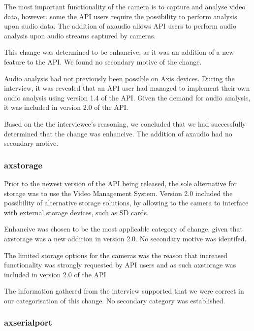 \documentclass{sig-alternate}
\begin{document}
The most important functionality of the camera is to capture and analyse video data, however, some the API users require the possibility to perform analysis upon audio data. The addition of axaudio allows API users to perform audio analysis upon audio streams captured by cameras. 

This change was determined to be enhancive, as it was an addition of a new feature to the API. We found no secondary motive of the change. 


Audio analysis had not previously been possible on Axis devices. During the interview, it was revealed that an API user had managed to implement their own audio analysis using version 1.4 of the API. Given the demand for audio analysis, it was included in version 2.0 of the API.

Based on the the interviewee's reasoning, we concluded that we had successfully determined that the change was enhancive. The addition of axaudio had no secondary motive. 

\subsubsection{axstorage}

Prior to the newest version of the API being released, the sole alternative for storage was to use the Video Management System. Version 2.0 included the possibility of alternative storage solutions, by allowing to the camera to interface with external storage devices, such as SD cards. 

Enhancive was chosen to be the most applicable category of change, given that axstorage was a new addition in version 2.0. No secondary motive was identifed. 

The limited storage options for the cameras was the reason that increased functionality was strongly requested by API users and as such axstorage was included in version 2.0 of the API.

The information gathered from the interview supported that we were correct in our categorisation of this change. No secondary category was established. 

\subsubsection{axserialport}
\end{document}

